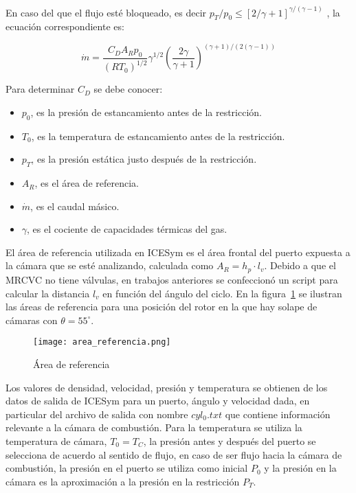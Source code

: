 En caso del que el flujo esté bloqueado, es decir
$p_T/p_0 \le {[2/\gamma+1]}^{\gamma/(\gamma - 1)}$
, la ecuación correspondiente es:

\begin{equation}
  \dot{m}=  \frac {C_D A_R p_0} {{(R T_0)}^{1/2}}
            \gamma^{1/2}
            {\left( \frac{2\gamma}{\gamma+1} \right)}^{(\gamma+1)/(2(\gamma-1))}
\end{equation}

Para determinar $C_D$ se debe conocer:

\begin{itemize}
    \item $p_0$, es la presión de estancamiento antes de la restricción.
    \item $T_0$, es la temperatura de estancamiento antes de la restricción.
    \item $p_T$, es la presión estática justo después de la restricción.
    \item $A_R$, es el área de referencia.
    \item $\dot{m}$, es el caudal másico.
    \item $\gamma$, es el cociente de capacidades térmicas del gas.
\end{itemize}

El área de referencia utilizada en ICESym es el área frontal del puerto expuesta
a la cámara que se esté analizando, calculada como $A_{R} = h_{p} \cdot l_{{v}}$.
%
Debido a que el MRCVC no tiene válvulas, en trabajos anteriores se confeccionó
un script para calcular la distancia $l_v$ en función del ángulo del ciclo.
%
En la figura~\ref{fig:area_referencia} se ilustran las áreas de referencia para
una posición del rotor en la que hay solape de cámaras con $\theta = 55^\circ$.

\begin{figure}
    \centering
    \texttt{[image: area\_referencia.png]}
    \caption{Área de referencia}\label{fig:area_referencia}
\end{figure}

Los valores de densidad, velocidad, presión y temperatura se obtienen de los
datos de salida de ICESym para un puerto, ángulo y velocidad dada, en
particular del archivo de salida con nombre \emph{$cyl_0.txt$} que contiene
información relevante a la cámara de combustión.
%
Para la temperatura se utiliza la temperatura de cámara, $T_0 = T_C$, la
presión antes y después del puerto se selecciona de acuerdo al sentido de
flujo, en caso de ser flujo hacia la cámara de combustión, la presión en el
puerto se utiliza como inicial $P_0$ y la presión en la cámara es la
aproximación a la presión en la restricción $P_T$.

